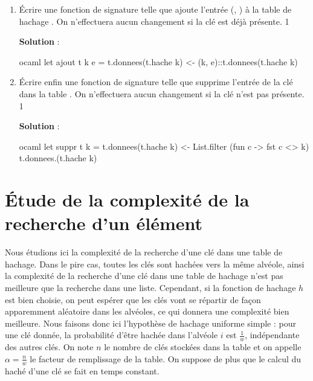 \documentclass[10pt,a4paper, varwidth]{article}
\def\cor{1}
\begin{document}
\begin{enumerate}
\begin{emphase}
\begin{center}
            \end{center}
        \end{emphase}
        \fi
		\item Écrire une fonction  de signature  telle que  ajoute l'entrée (, ) à la table de hachage . On n'effectuera aucun changement si la clé est déjà présente.
		\if\cor1
        \begin{emphase}
            \textbf{Solution} : 
            \begin{center}
\begin{code}{ocaml}
let ajout t k e =
    t.donnees(t.hache k) <- (k, e)::t.donnees(t.hache k)
\end{code}
            \end{center}
        \end{emphase}
        \fi
		\item Écrire enfin une fonction  de signature  telle que  supprime l'entrée de la clé  dans la table . On n'effectuera aucun changement si la clé n'est pas présente.
		\if\cor1
        \begin{emphase}
            \textbf{Solution} : 
            \begin{center}
\begin{code}{ocaml}
let suppr t k =
    t.donnees(t.hache k) <- List.filter (fun c -> fst c <> k) t.donnees.(t.hache k)
\end{code}
            \end{center}
        \end{emphase}
        \fi
	\end{enumerate}
		
	\section{Étude de la complexité de la recherche d'un élément}
	Nous étudions ici la complexité de la recherche d'une clé dans une table de hachage. Dans le pire cas, toutes les
	clés sont hachées vers la même alvéole, ainsi la complexité de la recherche d'une clé dans une table de hachage
	n'est pas meilleure que la recherche dans une liste. Cependant, si la fonction de hachage $h$ est bien choisie, 
    on peut espérer que les clés vont se répartir de façon apparemment aléatoire dans les alvéoles, ce qui donnera une
	complexité bien meilleure.
	Nous faisons donc ici l'hypothèse de hachage uniforme simple : pour une clé donnée, la probabilité d'être hachée
	dans l'alvéole $i$ est $\frac{1}{w}$, indépendante des autres clés. On note $n$ le nombre de clés stockées dans la table et on
	appelle $\alpha = \frac{n}{w}$ le facteur de remplissage de la table. On suppose de plus que le calcul du haché d'une clé se
	fait en temps constant.
	
\end{document}
